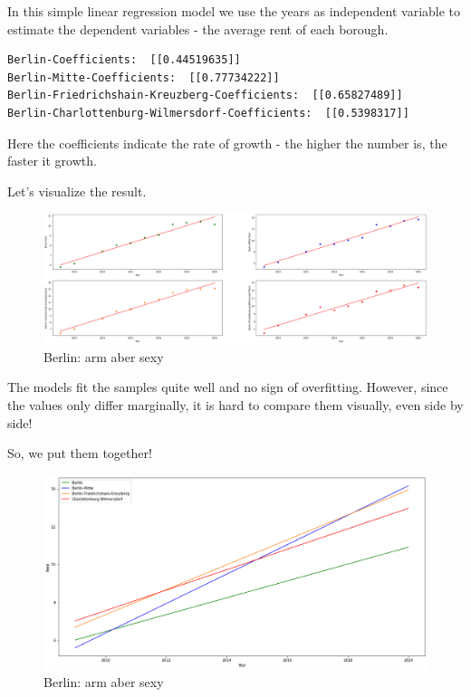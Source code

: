 \documentclass[11pt]{article}
\begin{document}
    In this simple linear regression model we use the years as independent
variable to estimate the dependent variables - the average rent of each
borough.

    

    \begin{Verbatim}[commandchars=\\\{\}]
Berlin-Coefficients:  [[0.44519635]]
Berlin-Mitte-Coefficients:  [[0.77734222]]
Berlin-Friedrichshain-Kreuzberg-Coefficients:  [[0.65827489]]
Berlin-Charlottenburg-Wilmersdorf-Coefficients:  [[0.5398317]]
    \end{Verbatim}

    Here the coefficients indicate the rate of growth - the higher the
number is, the faster it growth.

Let's visualize the result.

    
        
     \begin{figure}
\centering
\includegraphics[width=16.5cm]{"output_49_1.png"}
\caption{Berlin: arm aber sexy}
\end{figure}

    
    The models fit the samples quite well and no sign of overfitting.
However, since the values only differ marginally, it is hard to compare
them visually, even side by side!

So, we put them together!

    

    \begin{figure}
\centering
\includegraphics[width=16.5cm]{"output_51_0.png"}
\caption{Berlin: arm aber sexy}
\end{figure}
\end{document}
